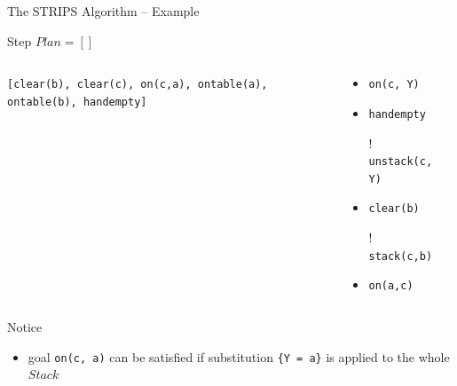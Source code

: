 \documentclass[presentation]{beamer}\mode<presentation>{\usetheme{AMSBolognaFC}}
\begin{document}
\begin{frame}[c]{The STRIPS Algorithm -- Example}
\small

	\begin{exampleblock}{Step \nextStripsExampleStep{} \hfill $Plan = []$}
		\begin{columns}[t]
			\begin{column}{.30\linewidth}\centering
				\texttt{[clear(b), clear(c), \alert{on(c,a)}, ontable(a), ontable(b), handempty]}
			\end{column}
			\begin{column}{.50\linewidth}\centering
				\begin{itemize}
					\item \alert{\texttt{on(c, Y)}}
					\item \texttt{handempty}
					\item[!] \texttt{unstack(c, Y)}
					\item \texttt{clear(b)}
					\item[!] \texttt{stack(c,b)}
					\item \texttt{on(a,c)}
				\end{itemize}
			\end{column}
			\begin{column}{.10\linewidth}\centering
				
			\end{column}
		\end{columns}
	\end{exampleblock}

    \vfill

	\footnotesize
	Notice
	\begin{itemize}\tiny
	    \item goal \texttt{on(c, a)} can be satisfied if substitution \texttt{\{Y = a\}} is applied to the whole $Stack$
	\end{itemize}

\end{frame}
\end{document}
